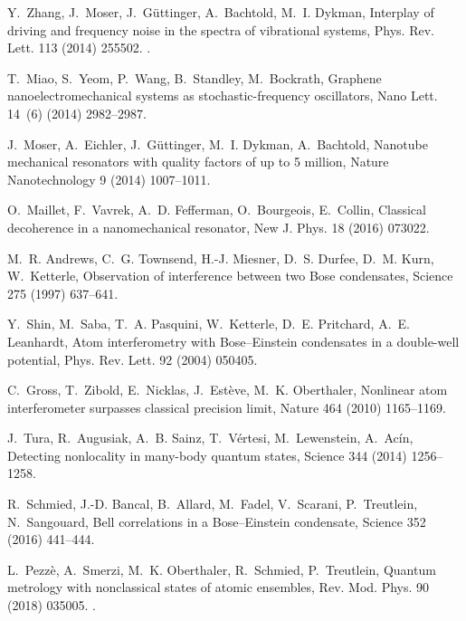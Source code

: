\documentclass[3p,sort&compress,12pt]{elsarticle}
\begin{document}
\begin{thebibliography}{100}
Y.~Zhang, J.~Moser, J.~G\"uttinger, A.~Bachtold, M.~I. Dykman, Interplay of
  driving and frequency noise in the spectra of vibrational systems, Phys. Rev.
  Lett. 113 (2014) 255502.
\newblock \href {http://dx.doi.org/10.1103/PhysRevLett.113.255502}
  {}.

T.~Miao, S.~Yeom, P.~Wang, B.~Standley, M.~Bockrath, Graphene
  nanoelectromechanical systems as stochastic-frequency oscillators, Nano Lett.
  14~(6) (2014) 2982--2987.

J.~Moser, A.~Eichler, J.~G{\"u}ttinger, M.~I. Dykman, A.~Bachtold, Nanotube
  mechanical resonators with quality factors of up to 5 million, Nature
  Nanotechnology 9 (2014) 1007--1011.

O.~Maillet, F.~Vavrek, A.~D. Fefferman, O.~Bourgeois, E.~Collin, Classical
  decoherence in a nanomechanical resonator, New J. Phys. 18 (2016) 073022.

M.~R. Andrews, C.~G. Townsend, H.-J. Miesner, D.~S. Durfee, D.~M. Kurn,
  W.~Ketterle, Observation of interference between two {B}ose condensates,
  Science 275 (1997) 637--641.

Y.~Shin, M.~Saba, T.~A. Pasquini, W.~Ketterle, D.~E. Pritchard, A.~E.
  Leanhardt, Atom interferometry with {B}ose--{E}instein condensates in a
  double-well potential, Phys. Rev. Lett. 92 (2004) 050405.

C.~Gross, T.~Zibold, E.~Nicklas, J.~Est{\`e}ve, M.~K. Oberthaler, Nonlinear
  atom interferometer surpasses classical precision limit, Nature 464 (2010)
  1165--1169.

J.~Tura, R.~Augusiak, A.~B. Sainz, T.~V{\'e}rtesi, M.~Lewenstein, A.~Ac{\'i}n,
  Detecting nonlocality in many-body quantum states, Science 344 (2014)
  1256--1258.

R.~Schmied, J.-D. Bancal, B.~Allard, M.~Fadel, V.~Scarani, P.~Treutlein,
  N.~Sangouard, Bell correlations in a {B}ose--{E}instein condensate, Science
  352 (2016) 441--444.

L.~Pezz\`e, A.~Smerzi, M.~K. Oberthaler, R.~Schmied, P.~Treutlein, Quantum
  metrology with nonclassical states of atomic ensembles, Rev. Mod. Phys. 90
  (2018) 035005.
\newblock \href {http://dx.doi.org/10.1103/RevModPhys.90.035005}
  {}.


\end{thebibliography}
\end{document}

